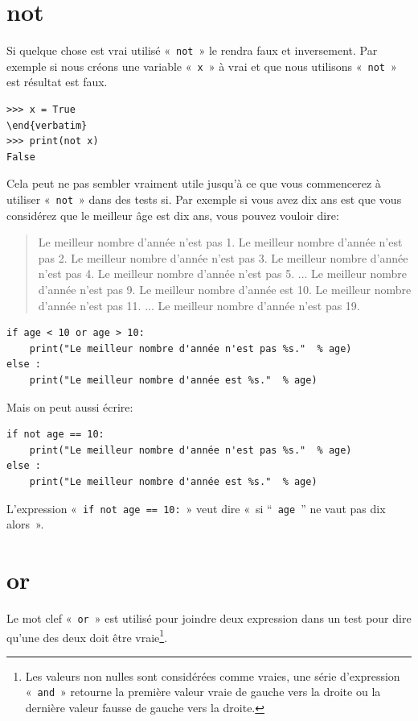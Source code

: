 \section*{not}
Si quelque chose est vrai utilisé « \texttt{not} » le rendra faux et inversement. Par exemple si nous créons une variable « \texttt{x} »  à vrai et que nous utilisons « \texttt{not} » est résultat est faux.
\begin{Verbatim}[frame=single,rulecolor=\color{gray}]
>>> x = True
\end{verbatim}
>>> print(not x)
False
\end{Verbatim}

Cela peut ne pas sembler vraiment utile jusqu'à ce que vous commencerez à utiliser « \texttt{not} »  dans des tests si. Par exemple si vous avez dix ans est que vous considérez que le meilleur âge est dix ans, vous pouvez vouloir dire:

\begin{quotation}
Le meilleur nombre d'année n'est pas 1.
Le meilleur nombre d'année n'est pas 2.
Le meilleur nombre d'année n'est pas 3.
Le meilleur nombre d'année n'est pas 4.
Le meilleur nombre d'année n'est pas 5.
...
Le meilleur nombre d'année n'est pas 9.
Le meilleur nombre d'année est 10.
Le meilleur nombre d'année n'est pas 11.
...
Le meilleur nombre d'année n'est pas 19.
\end{quotation}

\begin{Verbatim}[frame=single,rulecolor=\color{gray}]
if age < 10 or age > 10:
    print("Le meilleur nombre d'année n'est pas %s."  % age)
else :
    print("Le meilleur nombre d'année est %s."  % age)
\end{Verbatim}

Mais on peut aussi écrire:

\begin{Verbatim}[frame=single,rulecolor=\color{gray}]
if not age == 10:
    print("Le meilleur nombre d'année n'est pas %s."  % age)
else :
    print("Le meilleur nombre d'année est %s."  % age)
\end{Verbatim}

L'expression « \texttt{if not age == 10:} » veut dire « si “ \texttt{age} ” ne vaut pas dix alors ».


\section*{or}

Le mot clef « \texttt{or} » est utilisé pour joindre deux expression dans un test pour dire qu'une des deux doit être vraie\footnote{Les valeurs non nulles sont considérées comme vraies, une série d'expression « \texttt{and} » retourne la première valeur vraie de gauche vers la droite ou la  dernière valeur fausse de gauche vers la droite.}.

